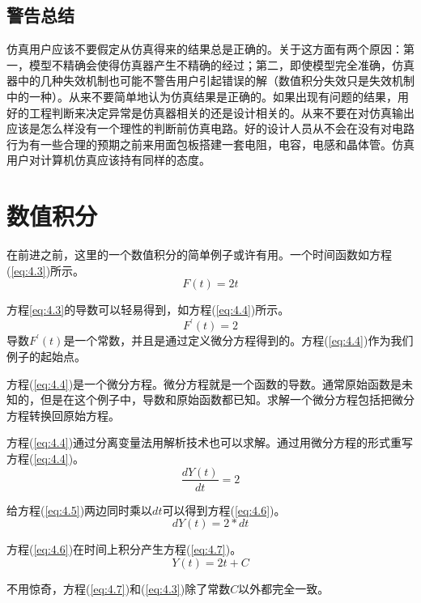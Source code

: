 \subsection{警告总结}
仿真用户应该不要假定从仿真得来的结果总是正确的。关于这方面有两个原因：第一，模型不精确会使得仿真器产生不精确的经过；第二，即使模型完全准确，仿真器中的几种失效机制也可能不警告用户引起错误的解（数值积分失效只是失效机制中的一种）。从来不要简单地认为仿真结果是正确的。如果出现有问题的结果，用好的工程判断来决定异常是仿真器相关的还是设计相关的。从来不要在对仿真输出应该是怎么样没有一个理性的判断前仿真电路。好的设计人员从不会在没有对电路行为有一些合理的预期之前来用面包板搭建一套电阻，电容，电感和晶体管。仿真用户对计算机仿真应该持有同样的态度。

\section{数值积分}
在前进之前，这里的一个数值积分的简单例子或许有用。一个时间函数如方程(\ref{eq:4.3})所示。
\begin{equation}
    F(t)=2t
    \label{eq:4.3}
\end{equation}

方程\ref{eq:4.3}的导数可以轻易得到，如方程(\ref{eq:4.4})所示。
\begin{equation}
    F^{'}(t)=2
    \label{eq:4.4}
\end{equation}
导数$F^{'}(t)$是一个常数，并且是通过定义微分方程得到的。方程(\ref{eq:4.4})作为我们例子的起始点。

方程(\ref{eq:4.4})是一个微分方程。微分方程就是一个函数的导数。通常原始函数是未知的，但是在这个例子中，导数和原始函数都已知。求解一个微分方程包括把微分方程转换回原始方程。

方程(\ref{eq:4.4})通过分离变量法用解析技术也可以求解。通过用微分方程的形式重写方程(\ref{eq:4.4})。
\begin{equation}
    \frac{dY(t)}{dt}=2
    \label{eq:4.5}
\end{equation}

给方程(\ref{eq:4.5})两边同时乘以$dt$可以得到方程(\ref{eq:4.6})。
\begin{equation}
    dY(t)=2*dt
    \label{eq:4.6}
\end{equation}

方程(\ref{eq:4.6})在时间上积分产生方程(\ref{eq:4.7})。
\begin{equation}
    Y(t)=2t+C
    \label{eq:4.7}
\end{equation}

不用惊奇，方程(\ref{eq:4.7})和(\ref{eq:4.3})除了常数$C$以外都完全一致。

